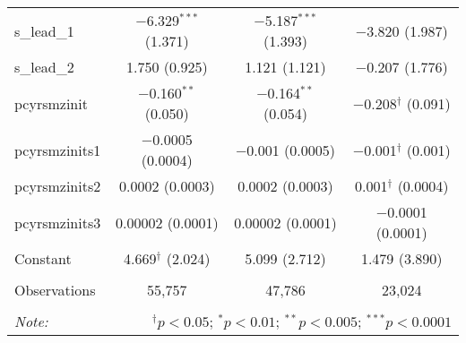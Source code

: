 \begin{table}[!htbp]
\begin{tabular}{@{\extracolsep{5pt}}lccc}
  s\_lead\_1 & $-$6.329$^{***}$ (1.371) & $-$5.187$^{***}$ (1.393) & $-$3.820 (1.987) \\ 
  s\_lead\_2 & 1.750 (0.925) & 1.121 (1.121) & $-$0.207 (1.776) \\ 
  pcyrsmzinit & $-$0.160$^{**}$ (0.050) & $-$0.164$^{**}$ (0.054) & $-$0.208$^{\dagger}$ (0.091) \\ 
  pcyrsmzinits1 & $-$0.0005 (0.0004) & $-$0.001 (0.0005) & $-$0.001$^{\dagger}$ (0.001) \\ 
  pcyrsmzinits2 & 0.0002 (0.0003) & 0.0002 (0.0003) & 0.001$^{\dagger}$ (0.0004) \\ 
  pcyrsmzinits3 & 0.00002 (0.0001) & 0.00002 (0.0001) & $-$0.0001 (0.0001) \\ 
  Constant & 4.669$^{\dagger}$ (2.024) & 5.099 (2.712) & 1.479 (3.890) \\ 
 \hline \\[-1.8ex] 
Observations & 55,757 & 47,786 & 23,024 \\ 
\hline 
\hline \\[-1.8ex] 
\textit{Note:}  & \multicolumn{3}{r}{$^{\dagger} p<0.05$; $^{*} p<0.01$; $^{**} p<0.005$; $^{***} p<0.0001$} \\ 
\end{tabular} 
\end{table} 
